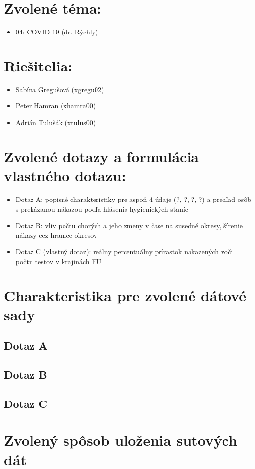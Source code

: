 \documentclass[11pt, a4paper]{article}
\begin{document}
\section*{Zvolené téma:} 
\begin{itemize}[noitemsep]
\item 04: COVID-19 (dr. Rýchly)
\end{itemize}

\section*{Riešitelia:}
\begin{itemize}[noitemsep]
\item Sabína Gregušová (xgregu02)
\item Peter Hamran (xhamra00)
\item Adrián Tulušák (xtulus00)
\end{itemize}

\section*{Zvolené dotazy a formulácia vlastného dotazu:}
\begin{itemize}[noitemsep]
\item Dotaz A: popisné charakteristiky pre aspoň 4 údaje (?, ?, ?, ?) a prehľad osôb s prekázanou nákazou podľa hlásenia hygienických staníc 
\item Dotaz B: vliv počtu chorých a jeho zmeny v čase na susedné okresy, šírenie nákazy cez hranice okresov
\item Dotaz C (vlastný dotaz):  reálny percentuálny prírastok nakazených voči počtu testov v krajinách EU
\end{itemize}

\section*{Charakteristika pre zvolené dátové sady}

\subsection*{Dotaz A}
\subsection*{Dotaz B}
\subsection*{Dotaz C}

\section*{Zvolený spôsob uloženia sutových dát}
\end{document}
